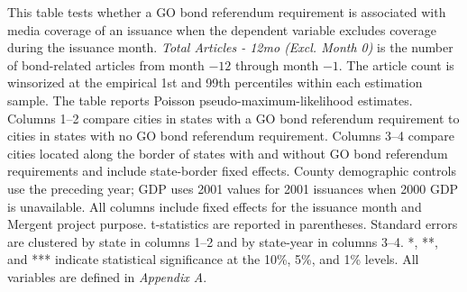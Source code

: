 \clearpage
\begin{table}[H]\centering
\def\sym#1{\ifmmode^{#1}\else\(^{#1}\)\fi}
\begingroup
\caption{\textbf{GO bond referendums and bond-related media coverage: Excluding the issuance month}}
\label{tab:media_coverage_exclude_month_zero}

\parbox{\textwidth}{This table tests whether a GO bond referendum requirement is associated with media coverage of an issuance when the dependent variable excludes coverage during the issuance month. \textit{Total Articles - 12mo (Excl. Month 0)} is the number of bond-related articles from month $-12$ through month $-1$. The article count is winsorized at the empirical 1st and 99th percentiles within each estimation sample. The table reports Poisson pseudo-maximum-likelihood estimates. Columns 1--2 compare cities in states with a GO bond referendum requirement to cities in states with no GO bond referendum requirement. Columns 3--4 compare cities located along the border of states with and without GO bond referendum requirements and include state-border fixed effects. County demographic controls use the preceding year; GDP uses 2001 values for 2001 issuances when 2000 GDP is unavailable. All columns include fixed effects for the issuance month and Mergent project purpose. t-statistics are reported in parentheses. Standard errors are clustered by state in columns 1--2 and by state-year in columns 3--4. *, **, and *** indicate statistical significance at the 10\%, 5\%, and 1\% levels. All variables are defined in \textit{Appendix A}.}
\endgroup
\end{table}


